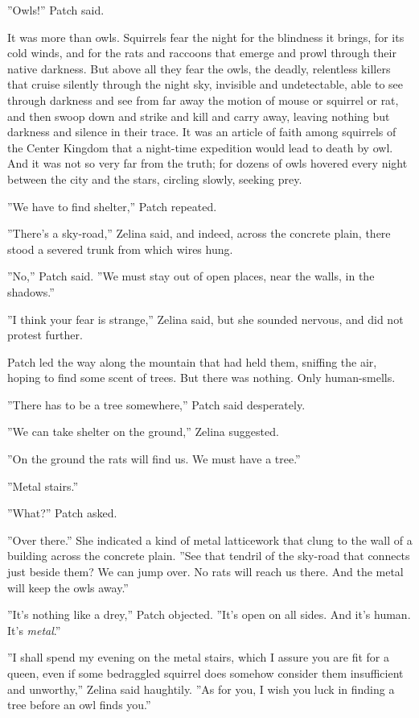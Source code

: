 \documentclass[12pt]{book}
\begin{document}
 ''Owls!'' Patch said.\par
 It was more than owls. Squirrels fear the night for the blindness it brings, for its cold winds, and for the rats and raccoons that emerge and prowl through their native darkness. But above all they fear the owls, the deadly, relentless killers that cruise silently through the night sky, invisible and undetectable, able to see through darkness and see from far away the motion of mouse or squirrel or rat, and then swoop down and strike and kill and carry away, leaving nothing but darkness and silence in their trace. It was an article of faith among squirrels of the Center Kingdom that a night-time expedition would lead to death by owl. And it was not so very far from the truth; for dozens of owls hovered every night between the city and the stars, circling slowly, seeking prey.\par
 ''We have to find shelter,'' Patch repeated.\par
 ''There's a sky-road,'' Zelina said, and indeed, across the concrete plain, there stood a severed trunk from which wires hung.\par
 ''No,'' Patch said. ''We must stay out of open places, near the walls, in the shadows.''\par
 ''I think your fear is strange,'' Zelina said, but she sounded nervous, and did not protest further.\par
 Patch led the way along the mountain that had held them, sniffing the air, hoping to find some scent of trees. But there was nothing. Only human-smells.\par
 ''There has to be a tree somewhere,'' Patch said desperately.\par
 ''We can take shelter on the ground,'' Zelina suggested.\par
 ''On the ground the rats will find us. We must have a tree.''\par
 ''Metal stairs.''\par
 ''What?'' Patch asked.\par
 ''Over there.'' She indicated a kind of metal latticework that clung to the wall of a building across the concrete plain. ''See that tendril of the sky-road that connects just beside them? We can jump over. No rats will reach us there. And the metal will keep the owls away.''\par
 ''It's nothing like a drey,'' Patch objected. ''It's open on all sides. And it's human. It's {\it metal}.''\par
 ''I shall spend my evening on the metal stairs, which I assure you are fit for a queen, even if some bedraggled squirrel does somehow consider them insufficient and unworthy,'' Zelina said haughtily. ''As for you, I wish you luck in finding a tree before an owl finds you.''\par
\end{document}
